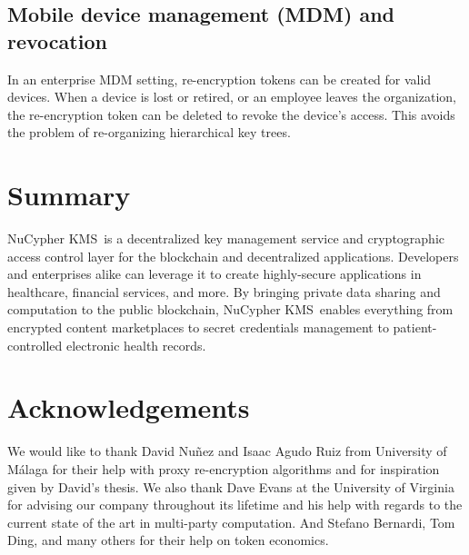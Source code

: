 \documentclass[longbibliography]{revtex4-1}
\newcommand{\kms}{NuCypher KMS}
\begin{document}
\subsection{Mobile device management (MDM) and revocation}
In an enterprise MDM setting, re-encryption tokens can be created for valid devices. When a device is lost or retired,
or an employee leaves the organization, the re-encryption token can be deleted to revoke the device's access. This avoids the
problem of re-organizing hierarchical key trees.

\section{Summary}
\kms~is a decentralized key management service and cryptographic access control layer for the blockchain and
decentralized applications.
Developers and enterprises alike can leverage it to create highly-secure applications in healthcare,
financial services, and more.
By bringing private data sharing and computation to the public blockchain, \kms~enables everything from encrypted
content marketplaces to secret credentials management to patient-controlled electronic health records.

\section{Acknowledgements}
We would like to thank David Nu{\~n}ez and Isaac Agudo Ruiz from University of M{\'a}laga
for their help with proxy re-encryption algorithms and for inspiration given by David's thesis.
We also thank Dave Evans at the University of Virginia for advising our company throughout its lifetime
and his help with regards to the current state of the art in multi-party computation.
And Stefano Bernardi, Tom Ding, and many others for their help on token economics.


\end{document}
